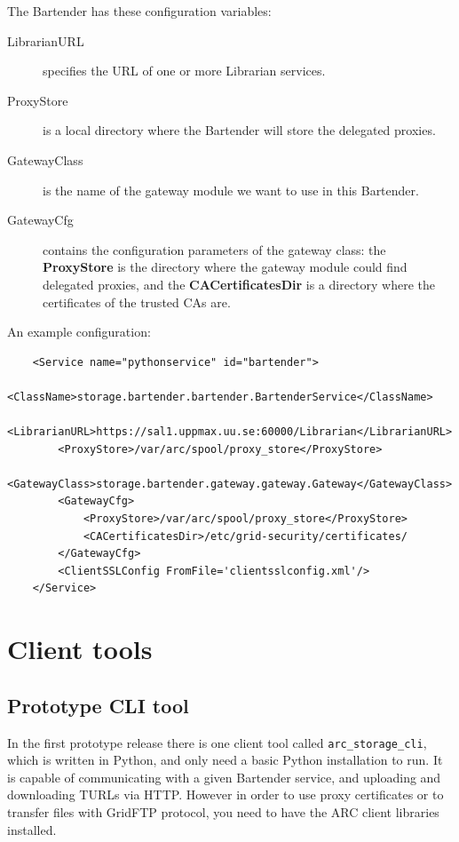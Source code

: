 \documentclass{book}
\begin{document}
The Bartender has these configuration variables:

\begin{description}
    \item[LibrarianURL] specifies the URL of one or more Librarian services.
    \item[ProxyStore] is a local directory where the Bartender will store the delegated proxies.
    \item[GatewayClass] is the name of the gateway module we want to use in this Bartender.
    \item[GatewayCfg] contains the configuration parameters of the gateway class: the \textbf{ProxyStore} is the directory where the gateway module could find delegated proxies, and the \textbf{CACertificatesDir} is a directory where the certificates of the trusted CAs are. 
\end{description}

An example configuration:

\begin{verbatim}
    <Service name="pythonservice" id="bartender">
        <ClassName>storage.bartender.bartender.BartenderService</ClassName>
        <LibrarianURL>https://sal1.uppmax.uu.se:60000/Librarian</LibrarianURL>
        <ProxyStore>/var/arc/spool/proxy_store</ProxyStore>
        <GatewayClass>storage.bartender.gateway.gateway.Gateway</GatewayClass>
        <GatewayCfg>
            <ProxyStore>/var/arc/spool/proxy_store</ProxyStore>
            <CACertificatesDir>/etc/grid-security/certificates/
        </GatewayCfg>
        <ClientSSLConfig FromFile='clientsslconfig.xml'/>
    </Service>
\end{verbatim}


\newpage

\section{Client tools} %
\label{sec:client_tools}

\subsection{Prototype CLI tool} %
\label{sub:prototype_cli_tool}

In the first prototype release there is one client tool called \verb!arc_storage_cli!, which is written in Python, and only need a basic Python installation to run. It is capable of communicating with a given Bartender service, and uploading and downloading TURLs via HTTP. However in order to use proxy certificates or to transfer files with GridFTP protocol, you need to have the ARC client libraries installed.
\end{document}
